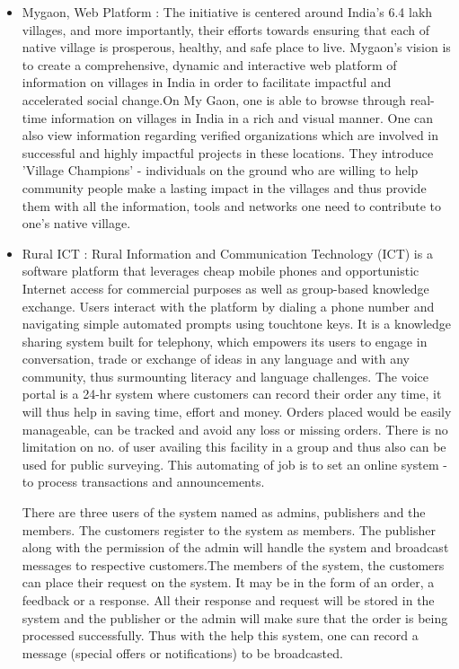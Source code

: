 \begin{itemize}
\item Mygaon, Web Platform \cite{MyGao25:online} : The initiative is centered around India’s 6.4 lakh villages, and more importantly, their efforts towards ensuring that each of native village is prosperous, healthy, and safe place to live. Mygaon's vision is to create a comprehensive, dynamic and interactive web platform of information on villages in India in order to facilitate impactful and accelerated social change.On My Gaon, one is able to browse through real-time information on villages in India in a rich and visual manner. One can also view information regarding verified organizations which are involved in successful and highly impactful projects in these locations. They introduce 'Village Champions' - individuals on the ground who are willing to help community people make a lasting impact in the villages and thus provide them with all the information, tools and networks one need to contribute to one's native village.

\item Rural ICT : Rural Information and Communication Technology (ICT) is a software platform that leverages cheap mobile phones and opportunistic Internet access for commercial purposes as well as group-based knowledge exchange. Users interact with the platform by dialing a phone number and navigating simple automated prompts using touchtone keys. It is a knowledge sharing system built for telephony, which empowers its users to engage in conversation, trade or exchange of ideas in any language and with any community, thus surmounting literacy and language challenges. The voice portal is a 24-hr system where customers can record their order any time, it will thus help in saving time, effort and money. Orders placed would be easily manageable, can be tracked and avoid any loss or missing orders. There is no limitation on no. of user availing this facility in a group and thus also can be used for public surveying. This automating of job is to set an online system - to process transactions and announcements.

There are three users of the system named as admins, publishers and the members. The customers register to the system as members. The publisher along with the permission of the admin will handle the system and broadcast messages to respective customers.The members of the system, the customers can place their request on the system. It may be in the form of an order, a feedback or a response. All their response and request will be stored in the system and the publisher or the admin will make sure that the order is being processed successfully. Thus with the help this system, one can record a message (special offers or notifications) to be broadcasted.


\end{itemize}
